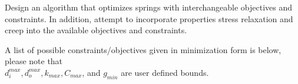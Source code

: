 \documentclass[10pt]{article}
\begin{document}
Design an algorithm that optimizes springs with interchangeable objectives and constraints. In addition, attempt to incorporate properties stress relaxation and creep into the available objectives and constraints. 

A list of possible constraints/objectives given in minimization form is below, please note that \\$d_{i}^{max}, d_{o}^{max}, k_{max}, C_{max}$, and $g_{min}$ are user defined bounds. 
%
%
%
%
%
%
%
\end{document}
